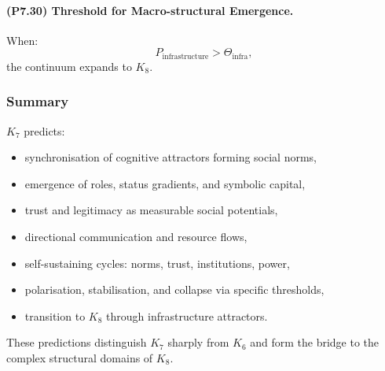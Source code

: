 \paragraph{(P7.30) Threshold for Macro-structural Emergence.}
When:
\[
P_{\mathrm{infrastructure}} > \Theta_{\mathrm{infra}},
\]
the continuum expands to $K_8$.

\subsubsection{Summary}

$K_7$ predicts:
\begin{itemize}
    \item synchronisation of cognitive attractors forming social norms,
    \item emergence of roles, status gradients, and symbolic capital,
    \item trust and legitimacy as measurable social potentials,
    \item directional communication and resource flows,
    \item self-sustaining cycles: norms, trust, institutions, power,
    \item polarisation, stabilisation, and collapse via specific thresholds,
    \item transition to $K_8$ through infrastructure attractors.
\end{itemize}

These predictions distinguish $K_7$ sharply from $K_6$ and form the bridge
to the complex structural domains of $K_8$.
